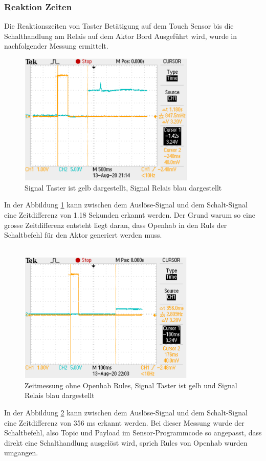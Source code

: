 \subsubsection{Reaktion Zeiten}
Die Reaktionszeiten von Taster Betätigung auf dem Touch Sensor bis die Schalthandlung am Relais auf dem Aktor Bord  Ausgeführt wird, wurde in nachfolgender Messung ermittelt. 
\begin{figure}[H]
	\centering
	\includegraphics[width=0.75\textwidth]{graphics/ZeitmessungOH.PNG}
	\caption{Signal Taster ist gelb dargestellt, Signal Relais blau dargestellt}
	\label{pic: Zeitmessung Openhab}
\end{figure}
In der Abbildung \ref{pic: Zeitmessung Openhab} kann zwischen dem Auslöse-Signal und dem Schalt-Signal eine Zeitdifferenz von 1.18 Sekunden erkannt werden. Der Grund warum so eine grosse Zeitdifferenz entsteht liegt daran, dass Openhab in den Ruls der Schaltbefehl für den Aktor generiert werden muss.\\
\\
\begin{figure}[H]
	\centering
	\includegraphics[width=0.75\textwidth]{graphics/ZeitmessungohneOH.PNG}
	\caption{Zeitmessung ohne Openhab Rules, Signal Taster ist gelb und Signal Relais blau dargestellt}
\label{pic: Zeitmessung ohne Openhab}
\end{figure}
In der Abbildung \ref{pic: Zeitmessung ohne Openhab} kann zwischen dem Auslöse-Signal und dem Schalt-Signal eine Zeitdifferenz von 356 ms erkannt werden. Bei dieser Messung wurde der Schaltbefehl, also Topic und Payload im Sensor-Programmcode so angepasst, dass direkt eine Schalthandlung ausgelöst wird, sprich Rules von Openhab wurden umgangen.